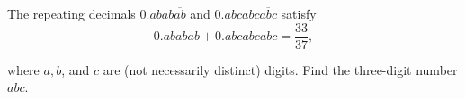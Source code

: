 The repeating decimals $0.abab\overline{ab}$ and $0.abcabc\overline{abc}$ satisfy\[0.abab\overline{ab}+0.abcabc\overline{abc}=\frac{33}{37},\]

where $a,b$,  and $c$ are (not necessarily distinct) digits. Find the three-digit number $abc$.